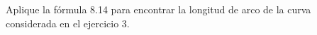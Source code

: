 \item Aplique la fórmula 8.14 para encontrar la longitud de arco de la curva considerada en el ejercicio 3.
